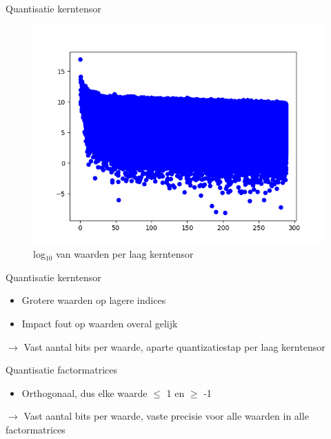 \documentclass[t,12pt,dutch
\ifx\beamermode\undefined\else,\beamermode\fi
]{beamer}
\begin{document}
\begin{frame}{Quantisatie kerntensor}

\begin{figure}[H]
\centering
\includegraphics[scale=0.5]{images/values_per_layer.png}
\caption{log$_{10}$ van waarden per laag kerntensor}
\end{figure}

\end{frame}

\begin{frame}{Quantisatie kerntensor}

\begin{itemize}
\item Grotere waarden op lagere indices
\item Impact fout op waarden overal gelijk
\end{itemize}
$\rightarrow$ Vast aantal bits per waarde, aparte quantizatiestap per laag kerntensor

\end{frame}

\begin{frame}{Quantisatie factormatrices}

\begin{itemize}
\item Orthogonaal, dus elke waarde $\leqslant$ 1 en $\geqslant$ -1
\end{itemize}
$\rightarrow$ Vast aantal bits per waarde, vaste precisie voor alle waarden in alle factormatrices

\end{frame}
\end{document}
